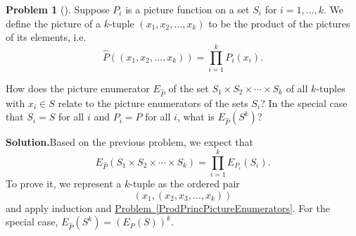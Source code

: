 \documentclass[10pt,]{book}
\theoremstyle{plain}
\theoremstyle{definition}
\newtheorem{activity}[project]{Problem}
\theoremstyle{definition}
\numberwithin{equation}{chapter}
\begin{document}
\begin{activity}[]\label{PictureEnumeratorforFunctions}
Suppose \(P_i\) is a picture function on a set \(S_i\) for \(i=1,\dots,k\). We define the picture of a \(k\)-tuple \((x_1,x_2,\dots,x_k)\) to be the product of the pictures of its elements, i.e.\@%
\begin{equation*}
\widehat P((x_1,x_2,\dots,x_k)) = \prod_{i=1}^k P_i(x_i).
\end{equation*}
%
\par
How does the picture enumerator \(E_{\widehat P}\) of the set \(S_1\times S_2\times\cdots\times S_k\) of all \(k\)-tuples with \(x_i\in S\) relate to the picture enumerators of the sets \(S_i\)? In the special case that \(S_i = S\) for all \(i\) and \(P_i = P\) for all \(i\), what is \(E_{\widehat{P}}(S^k)\)?%
\par\medskip\noindent%
\textbf{Solution.}\quad Based on the previous problem, we expect that%
\begin{equation*}
E_{\widehat{P}}(S_1\times S_2\times \cdots\times S_k) = \prod_{i=1}^k E_{P_i}(S_i)\text{.}
\end{equation*}
To prove it, we represent a \(k\)-tuple as the ordered pair%
\begin{equation*}
(x_1,(x_2,x_3,\dots,x_k))
\end{equation*}
and apply induction and \hyperref[ProdPrincPictureEnumerators]{Problem~\ref{ProdPrincPictureEnumerators}}. For the special case, \(E_{\widehat{P}}(S^k) = (E_P(S))^k\).%
\end{activity}
\end{document}
